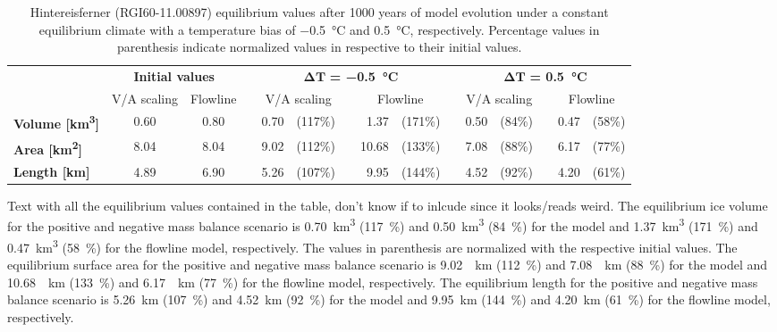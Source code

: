 \begin{table}
  \centering
  \caption{Hintereisferner (RGI60-11.00897) equilibrium values after 1000 years of model evolution under a constant equilibrium climate with a temperature bias of \SI{-0.5}{\celsius} and \SI{+0.5}{\celsius}, respectively. Percentage values in parenthesis indicate normalized values in respective to their initial values.}
  \label{tab:hintereisferner_equilibrium_values}
  \begin{tabular}{@{}lcccrlcrlcrlcrl@{}}
    \toprule
    {} & \multicolumn{2}{c}{\textbf{Initial values}} & \phantom{asdf} & \multicolumn{5}{c}{$\bm{\Delta T}$\textbf{ = \SI{-0.5}{\celsius}}} & \phantom{a} & \multicolumn{5}{c}{$\bm{\Delta T}$\textbf{ = \SI{+0.5}{\celsius}}} \\
    \cmidrule{2-3} \cmidrule{5-9} \cmidrule{11-15}
    {} & V/A scaling & Flowline & \phantom {} & \multicolumn{2}{c}{V/A scaling} & \phantom {} & \multicolumn{2}{c}{Flowline} & \phantom{a} & \multicolumn{2}{c}{V/A scaling} & \phantom {} & \multicolumn{2}{c}{Flowline} \\
    \midrule
    \textbf{Volume [\si{\cubic\kilo\meter}]} & 0.60 & 0.80 & &  0.70 & (117\%) & \phantom {} &  1.37 & (171\%) & \phantom{a} &  0.50 & (84\%) & \phantom {} &  0.47 & (58\%) \\
    \textbf{Area [\si{\square\kilo\meter}]} & 8.04 & 8.04 & &  9.02 & (112\%) & \phantom {} &  10.68 & (133\%) & \phantom{a} &  7.08 & (88\%) & \phantom {} &  6.17 & (77\%) \\
    \textbf{Length [\si{\kilo\meter}]} & 4.89 & 6.90 & & 5.26 & (107\%) & \phantom {} &  9.95 & (144\%) & \phantom{a} &  4.52 & (92\%) & \phantom {} &  4.20 & (61\%) \\
    \bottomrule
  \end{tabular}
\end{table}

Text with all the equilibrium values contained in the table, don't know if to inlcude since it looks/reads weird.
The equilibrium ice volume for the positive and negative mass balance scenario is \SI{0.70}{\cubic\kilo\meter} (\SI{117}{\percent}) and \SI{0.50}{\cubic\kilo\meter} (\SI{84}{\percent}) for the \vas{} model and \SI{1.37}{\cubic\kilo\meter} (\SI{171}{\percent}) and \SI{0.47}{\cubic\kilo\meter} (\SI{58}{\percent}) for the flowline model, respectively. The values in parenthesis are normalized with the respective initial values. The equilibrium surface area for the positive and negative mass balance scenario is \SI{9.02}{\squared\kilo\meter} (\SI{112}{\percent}) and \SI{7.08}{\squared\kilo\meter} (\SI{88}{\percent}) for the \vas{} model and \SI{10.68}{\squared\kilo\meter} (\SI{133}{\percent}) and \SI{6.17}{\squared\kilo\meter} (\SI{77}{\percent}) for the flowline model, respectively. The equilibrium length for the positive and negative mass balance scenario is \SI{5.26}{\kilo\meter} (\SI{107}{\percent}) and \SI{4.52}{\kilo\meter} (\SI{92}{\percent}) for the \vas{} model and \SI{9.95}{\kilo\meter} (\SI{144}{\percent}) and \SI{4.20}{\kilo\meter} (\SI{61}{\percent}) for the flowline model, respectively.

